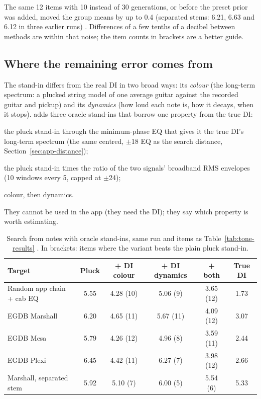 \begin{caution}
The same 12 items with 10 instead of 30 generations, or before the preset prior
was added, moved the group means by up to 0.4\dB{} (separated stems: 6.21,
6.63 and 6.12\dB{} in three earlier runs) \measured. Differences of a few tenths
of a decibel between methods are within that noise; the item counts in brackets
are a better guide.
\end{caution}

\subsection{Where the remaining error comes from}
\label{sec:results-gap}

The stand-in differs from the real DI in two broad ways: its \emph{colour} (the
long-term spectrum: a plucked string model of one average guitar against the
recorded guitar and pickup) and its \emph{dynamics} (how loud each note is, how
it decays, when it stops).  adds three oracle stand-ins
that borrow one property from the true DI:
\begin{description}[style=nextline,leftmargin=1.2cm]
\item[+ DI colour] the pluck stand-in through the minimum-phase EQ that gives it
  the true DI's long-term spectrum (the same centred, $\pm$18\dB{} EQ as the
  search distance, Section~\ref{sec:app-distance});
\item[+ DI dynamics] the pluck stand-in times the ratio of the two signals'
  broadband RMS envelopes (10\ms{} windows every 5\ms, capped at $\pm$24\dB);
\item[+ both] colour, then dynamics.
\end{description}
They cannot be used in the app (they need the DI); they say which property is
worth estimating.

\begin{table}[h]
\centering
\caption{Search from notes with oracle stand-ins, same run and items as
Table~\ref{tab:tone-results} \measured. In brackets: items where the variant
beats the plain pluck stand-in.}
\label{tab:tone-ablation}
\footnotesize
\setlength{\tabcolsep}{4pt}
\begin{tabular}{@{}lccccc@{}}
\toprule
Target & Pluck & + DI colour & + DI dynamics & + both & True DI \\
\midrule
Random app chain + cab EQ & 5.55 & 4.28 (10) & 5.06 (9) & 3.65 (12) & 1.73 \\
EGDB Marshall & 6.20 & 4.65 (11) & 5.67 (11) & 4.09 (12) & 3.07 \\
EGDB Mesa & 5.79 & 4.26 (12) & 4.96 (8) & 3.59 (11) & 2.44 \\
EGDB Plexi & 6.45 & 4.42 (11) & 6.27 (7) & 3.98 (12) & 2.66 \\
Marshall, separated stem & 5.92 & 5.10 (7) & 6.00 (5) & 5.54 (6) & 5.33 \\
\bottomrule
\end{tabular}
\end{table}

